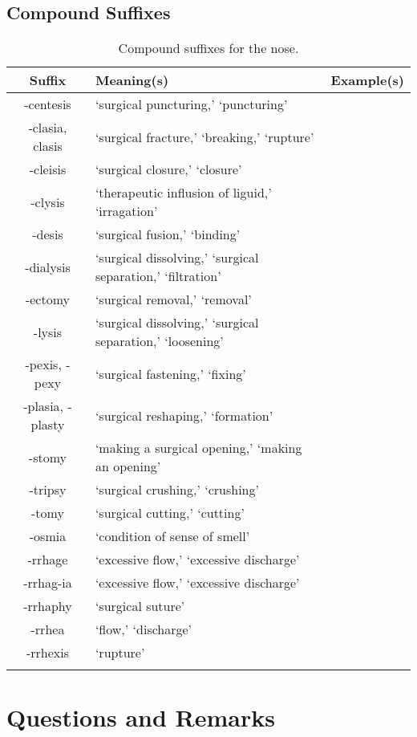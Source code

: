 \subsection{Compound Suffixes}


\begin{longtable}{c | p{} | p{}}
    \caption{Compound suffixes for the nose.}
    \hline
    Suffix & Meaning(s) & Example(s) \\ \hline
        -centesis & `surgical puncturing,' `puncturing' & \\
        -clasia, clasis & `surgical fracture,' `breaking,' `rupture' & \\
        -cleisis & `surgical closure,' `closure' & \\
        -clysis & `therapeutic influsion of liguid,' `irragation' & \\
        -desis & `surgical fusion,' `binding' & \\
        -dialysis & `surgical dissolving,' `surgical separation,' `filtration' & \\
        -ectomy & `surgical removal,' `removal' & \\
        -lysis & `surgical dissolving,' `surgical separation,' `loosening' & \\
        -pexis, -pexy & `surgical fastening,' `fixing' & \\
        -plasia, -plasty & `surgical reshaping,' `formation' & \\
        -stomy & `making a surgical opening,' `making an opening' & \\
        -tripsy & `surgical crushing,' `crushing' & \\
        -tomy & `surgical cutting,' `cutting' & \\
        -osmia & `condition of sense of smell' & \\
        -rrhage & `excessive flow,' `excessive discharge' & \\
        -rrhag-ia & `excessive flow,' `excessive discharge' & \\
        -rrhaphy & `surgical suture' & \\
        -rrhea & `flow,' `discharge' & \\
        -rrhexis & `rupture' & \\
    \label{tab:Ch7Suffix2}
\end{longtable}



\section{Questions and Remarks}
\label{sec:QR7}






